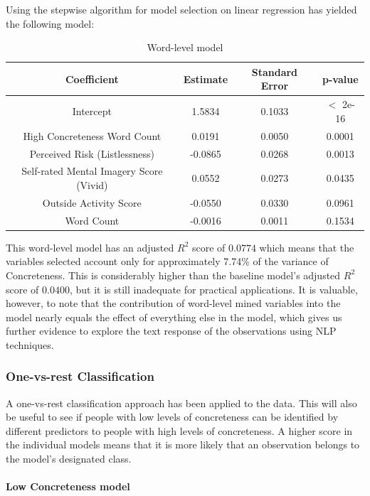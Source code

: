 \documentclass[12pt, a4paper]{article}
\begin{document}
Using the stepwise algorithm for model selection on linear regression has yielded the following model:

\begin{table}[ht]
\centering
\begin{tabular}{||c c c c||} 
 \hline
 Coefficient & Estimate & Standard Error & p-value \\ [0.5ex] 
 \hline\hline
 Intercept & 1.5834 & 0.1033 & $<$ 2e-16 \\ 
 High Concreteness Word Count\footnotemark & 0.0191 & 0.0050 & 0.0001 \\
 Perceived Risk (Listlessness) & -0.0865 & 0.0268 & 0.0013 \\
 Self-rated Mental Imagery Score (Vivid)  & 0.0552 & 0.0273 & 0.0435 \\
 Outside Activity Score & -0.0550 & 0.0330 & 0.0961 \\ 
 Word Count  & -0.0016 & 0.0011 & 0.1534 \\ [1ex] 
 \hline
\end{tabular}
\caption{Word-level model}
\label{table:2}
\end{table}

This word-level model has an adjusted $R^2$ score of $0.0774$ which means that the variables selected account only for approximately 7.74\% of the variance of Concreteness. This is considerably higher than the baseline model's adjusted $R^2$ score of $0.0400$, but it is still inadequate for practical applications. It is valuable, however, to note that the contribution of word-level mined variables into the model nearly equals the effect of everything else in the model, which gives us further evidence to explore the text response of the observations using NLP techniques.
 
\subsubsection{One-vs-rest Classification}

A one-vs-rest classification approach has been applied to the data. This will also be useful to see if people with low levels of concreteness can be identified by different predictors to people with high levels of concreteness. A higher score in the individual models means that it is more likely that an observation belongs to the model's designated class.

\paragraph{Low Concreteness model}
\end{document}
